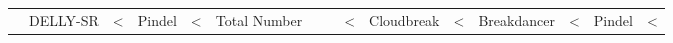 \begin{table}
\begin{center}
\begin{tabular}{r|rrr|rrrrr}
&  DELLY-SR & <%
&  Pindel & <%
\hline
{} & Total Number & & & <%
& Cloudbreak & <%
& Breakdancer & <%
&  Pindel & <%

\end{tabular}
\end{center}
\end{table}
